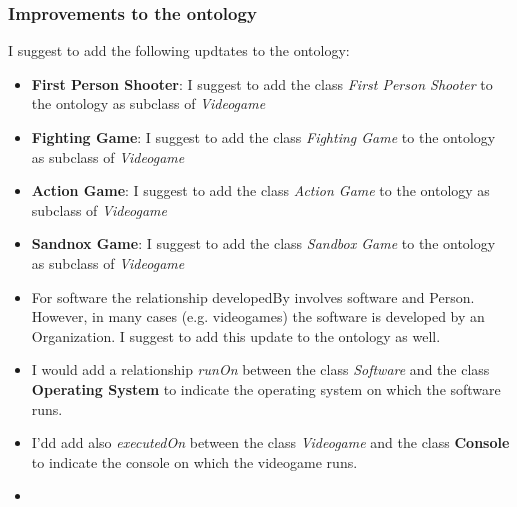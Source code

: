 \subsubsection{Improvements to the ontology}
I suggest to add the following updtates to the ontology:
\begin{itemize}
    \item \textbf{First Person Shooter}: I suggest to add the class \textit{First Person Shooter} to the ontology as subclass of \textit{Videogame}
    \item \textbf{Fighting Game}: I suggest to add the class \textit{Fighting Game} to the ontology as subclass of \textit{Videogame}
    \item \textbf{Action Game}: I suggest to add the class \textit{Action Game} to the ontology as subclass of \textit{Videogame}
    \item \textbf{Sandnox Game}: I suggest to add the class \textit{Sandbox Game} to the ontology as subclass of \textit{Videogame}
    \item For software the relationship developedBy involves software and Person. However, in many cases (e.g. videogames) the software is developed by an Organization. I suggest to add this update to the ontology as well.
    \item I would add a relationship \textit{runOn} between the class \textit{Software} and the class \textbf{Operating System} to indicate the operating system on which the software runs.
    \item I'dd add also \textit{executedOn} between the class \textit{Videogame} and the class \textbf{Console} to indicate the console on which the videogame runs.
    \item 
\end{itemize}


